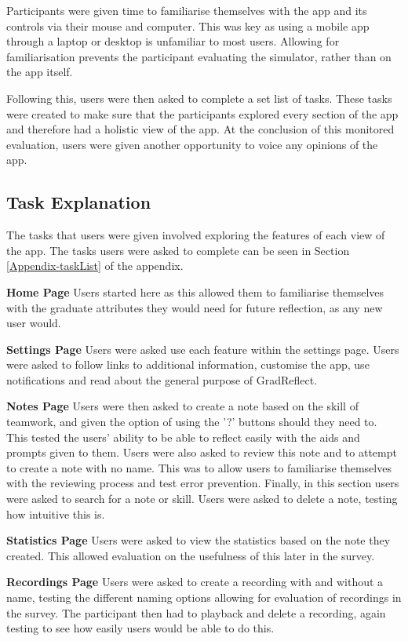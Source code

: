 \documentclass{l4proj}
\begin{document}
Participants were given time to familiarise themselves with the app and its controls via their mouse and computer. This was key as using a mobile app through a laptop or desktop is unfamiliar to most users. Allowing for familiarisation prevents the participant evaluating the simulator, rather than on the app itself. 
 
Following this, users were then asked to complete a set list of tasks. These tasks were created to make sure that the participants explored every section of the app and therefore had a holistic view of the app. At the conclusion of this monitored evaluation, users were given another opportunity to voice any opinions of the app.


\subsection{Task Explanation}

The tasks that users were given involved exploring the features of each view of the app. The tasks users were asked to complete can be seen in Section \ref{Appendix-taskList} of the appendix.

\textbf{Home Page} Users started here as this allowed them to familiarise themselves with the graduate attributes they would need for future reflection, as any new user would. 
 
\textbf{Settings Page} Users were asked use each feature within the settings page. Users were asked to follow links to additional information, customise the app, use notifications and read about the general purpose of GradReflect.

\textbf{Notes Page} Users were then asked to create a note based on the skill of teamwork, and given the option of using the '?' buttons should they need to. This tested the users’ ability to be able to reflect easily with the aids and prompts given to them. Users were also asked to review this note and to attempt to create a note with no name. This was to allow users to familiarise themselves with the reviewing process and test error prevention. Finally, in this section users were asked to search for a note or skill. Users were asked to delete a note, testing how intuitive this is.
 
\textbf{Statistics Page} Users were asked to view the statistics based on the note they created. This allowed evaluation on the usefulness of this later in the survey. 

\textbf{Recordings Page} Users were asked to create a recording with and without a name, testing the different naming options allowing for evaluation of recordings in the survey. The participant then had to playback and delete a recording, again testing to see how easily users would be able to do this.
\end{document}
